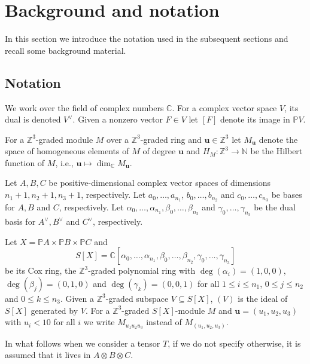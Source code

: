 \documentclass[12pt]{amsart}
\theoremstyle{definition}
\theoremstyle{remark}
\theoremstyle{definition}
\newcommand{\CC}{\mathbb{C}}
\newcommand{\PP}{\mathbb{P}}
\begin{document}
\section{Background and notation}\label{s:notation}
In this section we introduce the notation used in the subsequent sections and recall some background material.

\subsection{Notation}\label{subsec:not}
We work over the field of complex numbers $\CC$. For a complex vector space $V$, its dual is denoted $V^\vee$. Given a nonzero vector $F\in V$ let $[F]$ denote its image in $\PP V$.

For a $\mathbb{Z}^3$-graded module $M$ over a $\mathbb{Z}^3$-graded ring and $\mathbf{u}\in \mathbb{Z}^3$ let $M_\mathbf{u}$ denote the space of homogeneous elements of $M$ of degree $\mathbf{u}$ and $H_{M}\colon \mathbb{Z}^3\to \mathbb{N}$ be the Hilbert function of $M$, i.e., $\mathbf{u}\mapsto \dim_\CC M_{\mathbf{u}}$.

Let $A,B,C$ be positive-dimensional complex vector spaces of dimensions $n_1+1,n_2+1, n_3+1$, respectively.
Let $a_0,\ldots, a_{n_1}$, $b_0,\ldots, b_{n_2}$ and $c_0,\ldots, c_{n_3}$ be bases for $A,B$ and $C$, respectively. Let $\alpha_{0}, \ldots, \alpha_{n_1}, \beta_0,\ldots, \beta_{n_2}$ 
and $\gamma_0,\ldots, \gamma_{n_3}$ be the dual basis for $A^\vee, B^\vee$ and $C^\vee$, respectively.

Let $X=\PP A\times \PP B\times \PP C$ and 
\[
S[X] = \CC[\alpha_{0},\ldots, \alpha_{n_1}, \beta_0,\ldots, \beta_{n_2}, \gamma_0,\ldots, \gamma_{n_3}]
\]
be its Cox ring, the $\mathbb{Z}^3$-graded polynomial ring with $\deg(\alpha_{i}) =(1,0,0)$, $\deg(\beta_j) = (0,1,0)$ and $\deg(\gamma_k) = (0,0,1)$ for all $1\le i\le n_1$, $0\le j\le n_2$ and $0\le k\le n_3$. Given a $\mathbb{Z}^3$-graded subspace $V\subseteq S[X]$, $(V)$ is the ideal of $S[X]$ generated by $V$.  For a $\mathbb{Z}^3$-graded $S[X]$-module $M$ and $\mathbf{u} = (u_1, u_2, u_3)$ with $u_i < 10$ for all $i$ we write $M_{u_1u_2u_3}$ instead of $M_{(u_1,u_2,u_3)}$.

In what follows when  we consider a tensor $T$, if we do not specify otherwise, it is assumed that it lives in $A\otimes B\otimes C$.
\end{document}

